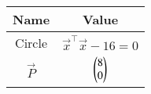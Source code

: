 \begin{tabular}{|c|c|}
\hline
\textbf{Name} & \textbf{Value} \\
\hline
Circle & $\vec{x}^\top \vec{x} - 16 = 0$ \\
\hline
$\vec{P}$ & $\begin{pmatrix}8 \\ 0\end{pmatrix}$ \\
\hline
\end{tabular}

